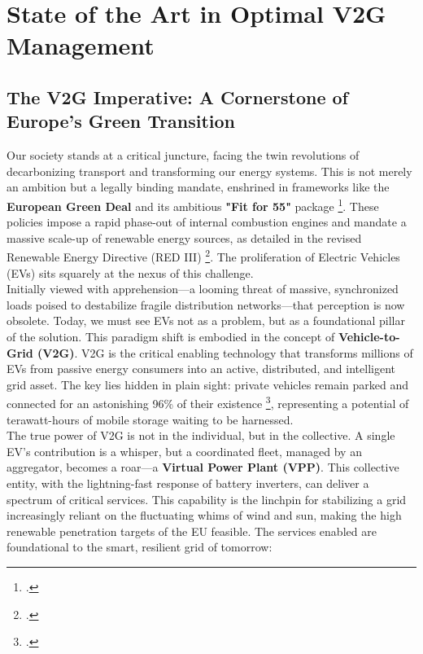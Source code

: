 \chapter{State of the Art in Optimal V2G Management}

\section{The V2G Imperative: A Cornerstone of Europe's Green Transition}
Our society stands at a critical juncture, facing the twin revolutions of decarbonizing transport and transforming our energy systems. This is not merely an ambition but a legally binding mandate, enshrined in frameworks like the \textbf{European Green Deal} and its ambitious \textbf{"Fit for 55"} package \footcite{european_commission_2021_fit_for_55}. These policies impose a rapid phase-out of internal combustion engines and mandate a massive scale-up of renewable energy sources, as detailed in the revised Renewable Energy Directive (RED III) \footcite{RED_III_directive_2023}. The proliferation of Electric Vehicles (EVs) sits squarely at the nexus of this challenge.
\\
\noindent
Initially viewed with apprehension—a looming threat of massive, synchronized loads poised to destabilize fragile distribution networks—that perception is now obsolete. Today, we must see EVs not as a problem, but as a foundational pillar of the solution. This paradigm shift is embodied in the concept of \textbf{Vehicle-to-Grid (V2G)}. V2G is the critical enabling technology that transforms millions of EVs from passive energy consumers into an active, distributed, and intelligent grid asset. The key lies hidden in plain sight: private vehicles remain parked and connected for an astonishing 96\% of their existence \footcite{evertsson2024investigating}, representing a potential of terawatt-hours of mobile storage waiting to be harnessed.
\\
\noindent
The true power of V2G is not in the individual, but in the collective. A single EV's contribution is a whisper, but a coordinated fleet, managed by an aggregator, becomes a roar—a \textbf{Virtual Power Plant (VPP)}. This collective entity, with the lightning-fast response of battery inverters, can deliver a spectrum of critical services. This capability is the linchpin for stabilizing a grid increasingly reliant on the fluctuating whims of wind and sun, making the high renewable penetration targets of the EU feasible. The services enabled are foundational to the smart, resilient grid of tomorrow:
